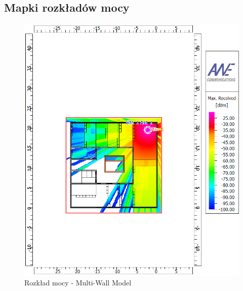 \documentclass[12pt, a4paper, oneside]{article}
\begin{document}
\subsection{Mapki rozkładów mocy}
\begin{figure}[h]
\centering
\caption{Rozkład mocy - Multi-Wall Model}
\includegraphics[scale=0.62]{MWM_RECEIVED.png}
\end{figure}
\end{document}
